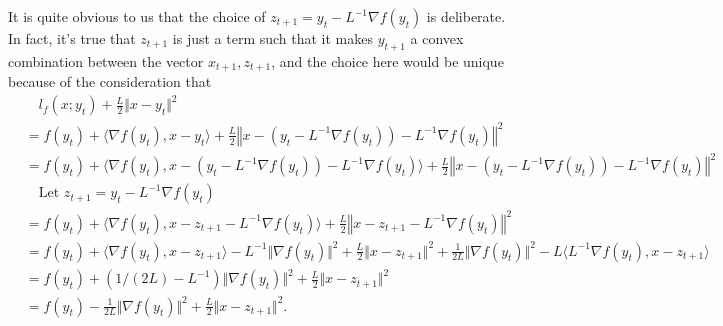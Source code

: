 \documentclass[12pt]{article}
\begin{document}
            \begin{remark}
                It is quite obvious to us that the choice of $z_{t + 1} = y_t - L^{-1}\nabla f(y_t)$ is deliberate. 
                In fact, it's true that $z_{t + 1}$ is just a term such that it makes $y_{t +1}$ a convex combination between the vector $x_{t + 1}, z_{t + 1}$, and the choice here would be unique because of the consideration that 
                {\footnotesize
                \begin{align*}
                    & \quad 
                    l_f(x; y_t) + \frac{L}{2}\Vert x - y_t\Vert^2 
                    \\
                    &= 
                    f(y_t) + \langle \nabla f(y_t), x - y_t\rangle 
                    + 
                    \frac{L}{2}
                    \left\Vert 
                        x - (y_t - L^{-1}\nabla f(y_t)) - L^{-1}\nabla f(y_t)
                    \right\Vert^2
                    \\
                    &= 
                    f(y_t) + 
                    \langle \nabla f(y_t), x - (y_t - L^{-1}\nabla f(y_t)) - L^{-1}\nabla f(y_t)\rangle 
                    + 
                    \frac{L}{2}
                    \left\Vert 
                        x - (y_t - L^{-1}\nabla f(y_t)) - L^{-1}\nabla f(y_t)
                    \right\Vert^2
                    \\
                    &\quad  \text{Let }z_{t + 1} 
                    = y_t - L^{-1}\nabla f(y_t)
                    \\
                    &= f(y_t) + \langle \nabla f(y_t), x - z_{t + 1} - L^{-1}\nabla f(y_t)\rangle
                    + 
                    \frac{L}{2}\left\Vert
                        x - z_{t + 1} - L^{-1}\nabla f(y_t)
                    \right\Vert^2
                    \\
                    &= 
                    f(y_t) + \langle \nabla f(y_t), x - z_{t + 1}\rangle 
                    - L^{-1}\Vert \nabla f(y_t)\Vert^2
                    + 
                    \frac{L}{2}\Vert x - z_{t + 1}\Vert^2 + 
                    \frac{1}{2L}\Vert \nabla f(y_t)\Vert^2 - 
                    L\langle L^{-1}\nabla f(y_t), x - z_{t + 1}\rangle
                    \\
                    &= f(y_t) + (1/(2L)- L^{-1})\Vert \nabla f(y_t) \Vert^2 + 
                    \frac{L}{2}\Vert x - z_{t + 1}\Vert^2
                    \\
                    &= f(y_t) - \frac{1}{2L}\Vert \nabla f(y_t)\Vert^2 + \frac{L}{2}\Vert x - z_{t + 1}\Vert^2. 

\end{align*}}
\end{remark}
\end{document}
